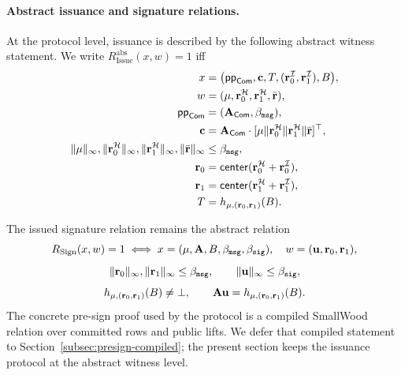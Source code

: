 \paragraph{Abstract issuance and signature relations.}
At the protocol level, issuance is described by the following abstract witness statement.
We write \(R_{\mathrm{Issue}}^{\mathrm{abs}}(x,w)=1\) iff
\[
\begin{aligned}
  x&=\bigl(\mathsf{pp}_{\mathsf{Com}},\mathbf{c},T,(\mathbf{r}_0^{\mathcal{I}},\mathbf{r}_1^{\mathcal{I}}),B\bigr),\\
  w&=(\mathbf{\mu},\mathbf{r}_0^{\mathcal{H}},\mathbf{r}_1^{\mathcal{H}},\bar{\mathbf{r}}),\\
  \mathsf{pp}_{\mathsf{Com}}&=(\mathbf{A}_{\mathsf{Com}},\beta_{\mathtt{msg}}),\\
  \mathbf{c}&=\mathbf{A}_{\mathsf{Com}}\cdot[\mathbf{\mu}\Vert \mathbf{r}_0^{\mathcal{H}}\Vert \mathbf{r}_1^{\mathcal{H}}\Vert \bar{\mathbf{r}}]^\top,\\
  \|\mathbf{\mu}\|_\infty,\|\mathbf{r}_0^{\mathcal{H}}\|_\infty,\|\mathbf{r}_1^{\mathcal{H}}\|_\infty,\|\bar{\mathbf{r}}\|_\infty&\le \beta_{\mathtt{msg}},\\
  \mathbf{r}_0&=\mathsf{center}(\mathbf{r}_0^{\mathcal{H}}+\mathbf{r}_0^{\mathcal{I}}),\\
  \mathbf{r}_1&=\mathsf{center}(\mathbf{r}_1^{\mathcal{H}}+\mathbf{r}_1^{\mathcal{I}}),\\
  T&=h_{\mathbf{\mu},(\mathbf{r}_0,\mathbf{r}_1)}(B).
\end{aligned}
\]

The issued signature relation remains the abstract relation
\[
R_{\mathrm{Sign}}(x,w)=1
\iff
x=(\mathbf{\mu},\mathbf{A},B,\beta_{\mathtt{msg}},\beta_{\mathtt{sig}}),\quad w=(\mathbf{u},\mathbf{r}_0,\mathbf{r}_1),
\]
\[
  \|\mathbf{r}_0\|_\infty,\|\mathbf{r}_1\|_\infty \le \beta_{\mathtt{msg}},
  \qquad
  \|\mathbf{u}\|_\infty \le \beta_{\mathtt{sig}},
\]
\[
  h_{\mathbf{\mu},(\mathbf{r}_0,\mathbf{r}_1)}(B)\neq\bot,
  \qquad
  \mathbf{A}\mathbf{u}=h_{\mathbf{\mu},(\mathbf{r}_0,\mathbf{r}_1)}(B).
\]
The concrete pre-sign proof used by the protocol is a compiled SmallWood relation over committed rows and public lifts.
We defer that compiled statement to Section~\ref{subsec:presign-compiled}; the present section keeps the issuance
protocol at the abstract witness level.

